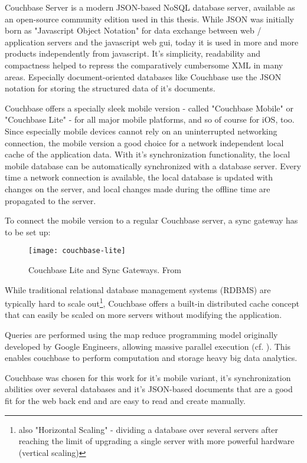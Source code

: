 Couchbase Server \cite{couchbase} is a modern JSON-based NoSQL database server, available as an open-source community edition used in this thesis. While JSON was initially born as "Javascript Object Notation" for data exchange between web / application servers and the javascript web gui, today it is used in more and more products independently from javascript. It's simplicity, readability and compactness helped to repress the comparatively cumbersome XML in many areas. Especially document-oriented databases like Couchbase use the JSON notation for storing the structured data of it's documents.

Couchbase offers a specially sleek mobile version - called "Couchbase Mobile" or "Couchbase Lite" - for all major mobile platforms, and so of course for iOS, too. Since especially mobile devices cannot rely on an uninterrupted networking connection, the mobile version a good choice for a network independent local cache of the application data. With it's synchronization functionality, the local mobile database can be automatically synchronized with a database server. Every time a network connection is available, the local database is updated with changes on the server, and local changes made during the offline time are propagated to the server.

To connect the mobile version to a regular Couchbase server, a sync gateway has to be set up:

\begin{figure}[H]
\centering
\texttt{[image: couchbase-lite]}
\caption{Couchbase Lite and Sync Gateways. From \cite{couchbase-lite}}
\end{figure}

While traditional relational database management systems (RDBMS) are typically hard to scale out\footnote{also "Horizontal Scaling" - dividing a database over several servers after reaching the limit of upgrading a single server with more powerful hardware (vertical scaling)}, Couchbase offers a built-in distributed cache concept that can easily be scaled on more servers without modifying the application.

Queries are performed using the map reduce programming model originally developed by Google Engineers, allowing massive parallel execution (cf. \cite{MapReduceArticle}). This enables couchbase to perform computation and storage heavy big data analytics.

Couchbase was chosen for this work for it's mobile variant, it's synchronization abilities over several databases and it's JSON-based documents that are a good fit for the web back end and are easy to read and create manually.


